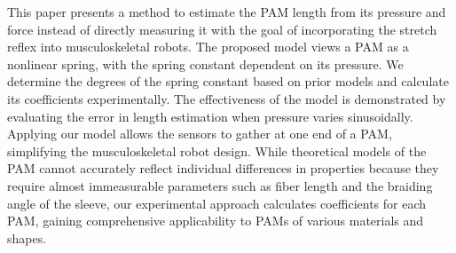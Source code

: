 This paper presents a method to estimate the PAM length from its pressure and force instead of directly measuring it with the goal of incorporating the stretch reflex into musculoskeletal robots.
The proposed model views a PAM as a nonlinear spring, with the spring constant dependent on its pressure. 
We determine the degrees of the spring constant based on prior models and calculate its coefficients experimentally.
The effectiveness of the model is demonstrated by evaluating the error in length estimation when pressure varies sinusoidally.
Applying our model allows the sensors to gather at one end of a PAM, simplifying the musculoskeletal robot design. 
While theoretical models of the PAM cannot accurately reflect individual differences in properties because they require almost immeasurable parameters such as fiber length and the braiding angle of the sleeve\cite{motion}, 
our experimental approach calculates coefficients for each PAM, gaining comprehensive applicability to PAMs of various materials and shapes.

